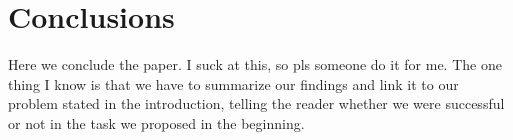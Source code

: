 \documentclass[12pt]{article}
\begin{document}
\begin{table}[h]
\centering
\caption{Model of confusion matrix PRA EU N TER Q FAZER ISSO DE NOVO}
\label{tab:confusion}
\end{table}

\section{Conclusions} \label{conc}

Here we conclude the paper. I suck at this, so pls someone do it for me. The one thing I know is that we have to summarize our findings and link it to our problem stated in the introduction, telling the reader whether we were successful or not in the task we proposed in the beginning.


\end{document}
